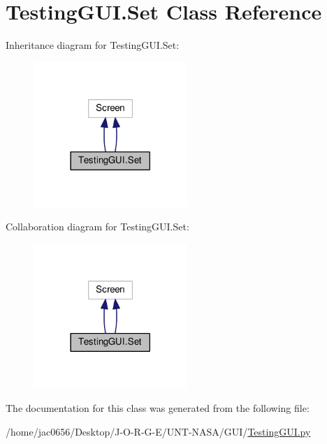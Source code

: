 \hypertarget{classTestingGUI_1_1Set}{}\section{Testing\+G\+U\+I.\+Set Class Reference}
\label{classTestingGUI_1_1Set}


Inheritance diagram for Testing\+G\+U\+I.\+Set\+:
\nopagebreak
\begin{figure}[H]
\begin{center}
\leavevmode
\includegraphics[width=165pt]{classTestingGUI_1_1Set__inherit__graph}
\end{center}
\end{figure}


Collaboration diagram for Testing\+G\+U\+I.\+Set\+:
\nopagebreak
\begin{figure}[H]
\begin{center}
\leavevmode
\includegraphics[width=165pt]{classTestingGUI_1_1Set__coll__graph}
\end{center}
\end{figure}


The documentation for this class was generated from the following file\+:\begin{DoxyCompactItemize}
\item 
/home/jac0656/\+Desktop/\+J-\/\+O-\/\+R-\/\+G-\/\+E/\+U\+N\+T-\/\+N\+A\+S\+A/\+G\+U\+I/\hyperlink{GUI_2TestingGUI_8py}{Testing\+G\+U\+I.\+py}\end{DoxyCompactItemize}

